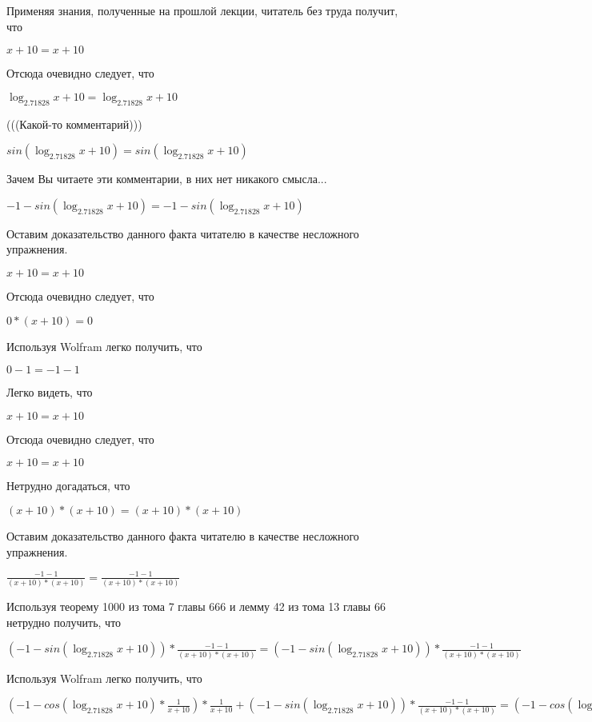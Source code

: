 \documentclass[12pt,a4paper,fleqn]{article}
\theoremstyle{definition}
\begin{document}
Применяя знания, полученные на прошлой лекции, читатель без труда получит, что 

$ x  +  10  =  x  +  10 $

Отсюда очевидно следует, что 

$\log_{ 2.71828 }{ x  +  10 } = \log_{ 2.71828 }{ x  +  10 }$

(((Какой-то комментарий))) 

$sin(\log_{ 2.71828 }{ x  +  10 }) = sin(\log_{ 2.71828 }{ x  +  10 })$

Зачем Вы читаете эти комментарии, в них нет никакого смысла... 

$ -1  - sin(\log_{ 2.71828 }{ x  +  10 }) =  -1  - sin(\log_{ 2.71828 }{ x  +  10 })$

Оставим доказательство данного факта читателю в качестве несложного упражнения. 

$ x  +  10  =  x  +  10 $

Отсюда очевидно следует, что 

$ 0  * ( x  +  10 ) =  0 $

Используя Wolfram легко получить, что 

$ 0  -  1  =  -1  -  1 $

Легко видеть, что 

$ x  +  10  =  x  +  10 $

Отсюда очевидно следует, что 

$ x  +  10  =  x  +  10 $

Нетрудно догадаться, что 

$( x  +  10 ) * ( x  +  10 ) = ( x  +  10 ) * ( x  +  10 )$

Оставим доказательство данного факта читателю в качестве несложного упражнения. 

$\frac{ -1  -  1 }{( x  +  10 ) * ( x  +  10 )}
 = \frac{ -1  -  1 }{( x  +  10 ) * ( x  +  10 )}
$

Используя теорему 1000 из тома 7 главы 666 и лемму 42 из тома 13 главы 66 нетрудно получить, что 

$( -1  - sin(\log_{ 2.71828 }{ x  +  10 })) * \frac{ -1  -  1 }{( x  +  10 ) * ( x  +  10 )}
 = ( -1  - sin(\log_{ 2.71828 }{ x  +  10 })) * \frac{ -1  -  1 }{( x  +  10 ) * ( x  +  10 )}
$

Используя Wolfram легко получить, что 

$( -1  - cos(\log_{ 2.71828 }{ x  +  10 }) * \frac{ 1 }{ x  +  10 }
) * \frac{ 1 }{ x  +  10 }
 + ( -1  - sin(\log_{ 2.71828 }{ x  +  10 })) * \frac{ -1  -  1 }{( x  +  10 ) * ( x  +  10 )}
 = ( -1  - cos(\log_{ 2.71828 }{ x  +  10 }) * \frac{ 1 }{ x  +  10 }
) * \frac{ 1 }{ x  +  10 }
 + ( -1  - sin(\log_{ 2.71828 }{ x  +  10 })) * \frac{ -1  -  1 }{( x  +  10 ) * ( x  +  10 )}
$
\end{document}
